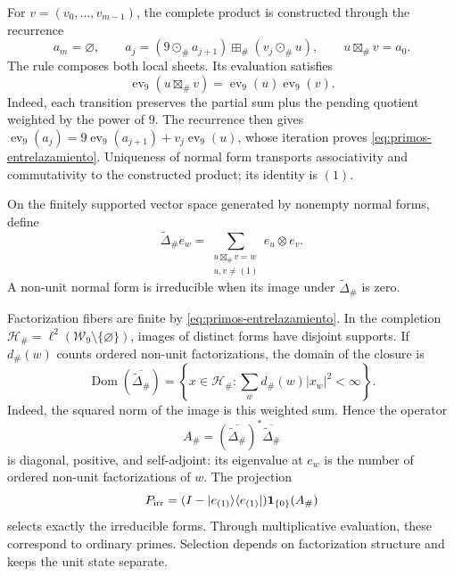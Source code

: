 For \(v=(v_0,\ldots,v_{m-1})\), the complete product is constructed
through the recurrence
\[
 a_m=\varnothing,\qquad
 a_j=(9\odot_\#a_{j+1})\boxplus_\#(v_j\odot_\#u),
 \qquad u\boxtimes_\#v=a_0.
\]
The rule composes both local sheets. Its evaluation satisfies
\begin{equation}
 \operatorname{ev}_9(u\boxtimes_\#v)
   =\operatorname{ev}_9(u)\operatorname{ev}_9(v).
 \label{eq:primos-entrelazamiento}
\end{equation}
Indeed, each transition preserves the partial sum plus the pending
quotient weighted by the power of \(9\). The recurrence then gives
\(\operatorname{ev}_9(a_j)=9\operatorname{ev}_9(a_{j+1})+
v_j\operatorname{ev}_9(u)\), whose iteration proves
\eqref{eq:primos-entrelazamiento}. Uniqueness of normal form transports
associativity and commutativity to the constructed product; its identity is \((1)\).

\begin{definition}
On the finitely supported vector space generated by nonempty normal
forms, define
\[
 \widetilde\Delta_\# e_w
 =\sum_{\substack{u\boxtimes_\#v=w\\u,v\ne(1)}}e_u\otimes e_v.
\]
A non-unit normal form is irreducible when its image under
\(\widetilde\Delta_\#\) is zero.
\end{definition}

Factorization fibers are finite by
\eqref{eq:primos-entrelazamiento}. In the completion
\(\mathcal H_\#=\ell^2(\mathcal W_9\setminus\{\varnothing\})\),
images of distinct forms have disjoint supports. If \(d_\#(w)\)
counts ordered non-unit factorizations, the domain of the closure is
\[
 \operatorname{Dom}(\overline{\widetilde\Delta_\#})
 =\left\{x\in\mathcal H_\#:
       \sum_w d_\#(w)|x_w|^2<\infty\right\}.
\]
Indeed, the squared norm of the image is this weighted sum. Hence
the operator
\[
 A_\#=(\overline{\widetilde\Delta_\#})^*
                  \overline{\widetilde\Delta_\#}
\]
is diagonal, positive, and self-adjoint: its eigenvalue at \(e_w\)
is the number of ordered non-unit factorizations of \(w\). The projection
\[
 P_{\rm irr}=(I-|e_{(1)}\rangle\langle e_{(1)}|)
                    \mathbf1_{\{0\}}(A_\#)
\]
selects exactly the irreducible forms. Through multiplicative evaluation,
these correspond to ordinary primes. Selection depends on factorization
structure and keeps the unit state separate.

